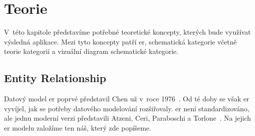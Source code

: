 \chapter{Teorie}

V~této kapitole představíme potřebné teoretické koncepty, kterých bude využívat výsledná aplikace.
Mezi tyto koncepty patří \acrfull{er}, schematická kategorie včetně teorie kategorií a vizuální diagram schematické kategorie.

\section{Entity Relationship}

Datový model \acrfull{er} poprvé představil Chen už v~roce 1976~\cite{chen_entity-relationship_1976}.
Od té doby se však \acrshort{er} vyvíjel, jak se potřeby datového modelování rozšiřovaly.
\acrshort{er} není standardizováno, ale jednu moderní verzi představili Atzeni, Ceri, Paraboschi a Torlone~\cite[s.~163-179]{atzeni_database_1999}.
Na jejich \acrshort{er} modelu založíme ten náš, který zde popíšeme.

